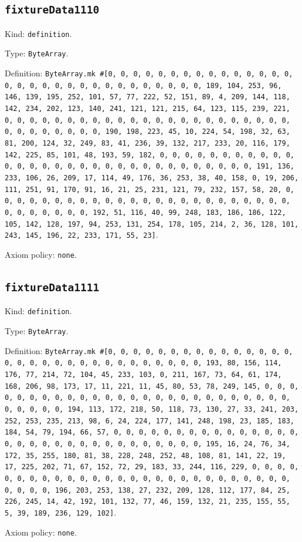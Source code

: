 \documentclass[11pt]{article}
\begin{document}
\subsection*{\texttt{fixtureData1110}}
\noindent Kind: \texttt{definition}.\par
\noindent Type: \texttt{ByteArray}.\par
\noindent Definition: \texttt{ByteArray.mk \#[0, 0, 0, 0, 0, 0, 0, 0, 0, 0, 0, 0, 0, 0, 0, 0, 0, 0, 0, 0, 0, 0, 0, 0, 0, 0, 0, 0, 0, 0, 0, 189, 104, 253, 96, 146, 139, 195, 252, 101, 57, 77, 222, 52, 151, 89, 4, 209, 144, 118, 142, 234, 202, 123, 140, 241, 121, 121, 215, 64, 123, 115, 239, 221, 0, 0, 0, 0, 0, 0, 0, 0, 0, 0, 0, 0, 0, 0, 0, 0, 0, 0, 0, 0, 0, 0, 0, 0, 0, 0, 0, 0, 0, 0, 0, 190, 198, 223, 45, 10, 224, 54, 198, 32, 63, 81, 200, 124, 32, 249, 83, 41, 236, 39, 132, 217, 233, 20, 116, 179, 142, 225, 85, 101, 48, 193, 59, 182, 0, 0, 0, 0, 0, 0, 0, 0, 0, 0, 0, 0, 0, 0, 0, 0, 0, 0, 0, 0, 0, 0, 0, 0, 0, 0, 0, 0, 0, 0, 0, 191, 136, 233, 106, 26, 209, 17, 114, 49, 176, 36, 253, 38, 40, 158, 0, 19, 206, 111, 251, 91, 170, 91, 16, 21, 25, 231, 121, 79, 232, 157, 58, 20, 0, 0, 0, 0, 0, 0, 0, 0, 0, 0, 0, 0, 0, 0, 0, 0, 0, 0, 0, 0, 0, 0, 0, 0, 0, 0, 0, 0, 0, 0, 0, 192, 51, 116, 40, 99, 248, 183, 186, 186, 122, 105, 142, 128, 197, 94, 253, 131, 254, 178, 105, 214, 2, 36, 128, 101, 243, 145, 196, 22, 233, 171, 55, 23]}.\par
\noindent Axiom policy: \texttt{none}.\par
\subsection*{\texttt{fixtureData1111}}
\noindent Kind: \texttt{definition}.\par
\noindent Type: \texttt{ByteArray}.\par
\noindent Definition: \texttt{ByteArray.mk \#[0, 0, 0, 0, 0, 0, 0, 0, 0, 0, 0, 0, 0, 0, 0, 0, 0, 0, 0, 0, 0, 0, 0, 0, 0, 0, 0, 0, 0, 0, 0, 193, 80, 156, 114, 176, 77, 214, 72, 104, 45, 233, 103, 0, 211, 167, 73, 64, 61, 174, 168, 206, 98, 173, 17, 11, 221, 11, 45, 80, 53, 78, 249, 145, 0, 0, 0, 0, 0, 0, 0, 0, 0, 0, 0, 0, 0, 0, 0, 0, 0, 0, 0, 0, 0, 0, 0, 0, 0, 0, 0, 0, 0, 0, 0, 194, 113, 172, 218, 50, 118, 73, 130, 27, 33, 241, 203, 252, 253, 235, 213, 98, 6, 24, 224, 177, 141, 248, 198, 23, 185, 183, 184, 54, 79, 194, 66, 57, 0, 0, 0, 0, 0, 0, 0, 0, 0, 0, 0, 0, 0, 0, 0, 0, 0, 0, 0, 0, 0, 0, 0, 0, 0, 0, 0, 0, 0, 0, 0, 195, 16, 24, 76, 34, 172, 35, 255, 180, 81, 38, 228, 248, 252, 48, 108, 81, 141, 22, 19, 17, 225, 202, 71, 67, 152, 72, 29, 183, 33, 244, 116, 229, 0, 0, 0, 0, 0, 0, 0, 0, 0, 0, 0, 0, 0, 0, 0, 0, 0, 0, 0, 0, 0, 0, 0, 0, 0, 0, 0, 0, 0, 0, 0, 196, 203, 253, 138, 27, 232, 209, 128, 112, 177, 84, 25, 226, 245, 14, 42, 192, 101, 132, 77, 46, 159, 132, 21, 235, 155, 55, 5, 39, 189, 236, 129, 102]}.\par
\noindent Axiom policy: \texttt{none}.\par
\end{document}
